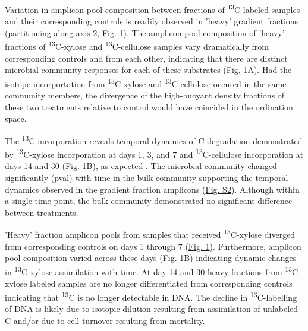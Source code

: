 Variation in amplicon pool composition between fractions of \textsuperscript{13}C-labeled samples and their corresponding controls is readily observed in 'heavy' gradient fractions (\href{https://www.authorea.com/users/3537/articles/3612/master/file/figures/ordination_all1/ordination_all1.png}{partitioning along axis 2, Fig. 1}). The amplicon pool composition of 'heavy' fractions of \textsuperscript{13}C-xylose and \textsuperscript{13}C-cellulose samples vary dramatically from corresponding controls and from each other, indicating that there are distinct microbial community responses for each of these substrates (\href{https://www.authorea.com/users/3537/articles/3612/master/file/figures/ordination_all1/ordination_all1.png}{Fig. 1A}). Had the isotope incorportation from \textsuperscript{13}C-xylose and \textsuperscript{13}C-cellulose occured in the same community members, the divergence of the high-buoyant density fractions of these two treatments relative to control would have coincided in the ordination space.  

The \textsuperscript{13}C-incorporation reveals temporal dynamics of C degradation demonstrated by \textsuperscript{13}C-xylose incorporation at days 1, 3, and 7 and \textsuperscript{13}C-cellulose incorporation at days 14 and 30 (\href{https://www.authorea.com/users/3537/articles/3612/master/file/figures/ordination_all1/ordination_all1.png}{Fig. 1B}), as expected \cite{Amelung_2008}. The microbial community changed significantly (pval) with time in the bulk community supporting the temporal dynamics observed in the gradient fraction amplicons (\href{https://authorea.com/users/3537/articles/8459/master/file/figures/bulk_ordination/bulk_ordination.png}{Fig. S2}). Although within a single time point, the bulk community demonstrated no significant difference between treatments. 

'Heavy' fraction amplicon pools from samples that received \textsuperscript{13}C-xylose diverged from corresponding controls on days 1 through 7 (\href{https://www.authorea.com/users/3537/articles/3612/master/file/figures/ordination_all1/ordination_all1.png}{Fig. 1}). Furthermore, amplicon pool composition varied across these days (\href{https://www.authorea.com/users/3537/articles/3612/master/file/figures/ordination_all1/ordination_all1.png}{Fig. 1B}) indicating dynamic changes in \textsuperscript{13}C-xylose assimilation with time. At day 14 and 30 heavy fractions from \textsuperscript{13}C-xylose labeled samples are no longer differentiated from corresponding controls indicating that \textsuperscript{13}C is no longer detectable in DNA. The decline in \textsuperscript{13}C-labelling of DNA is likely due to isotopic dilution resulting from assimilation of unlabeled C and/or due to cell turnover resulting from mortality. 

